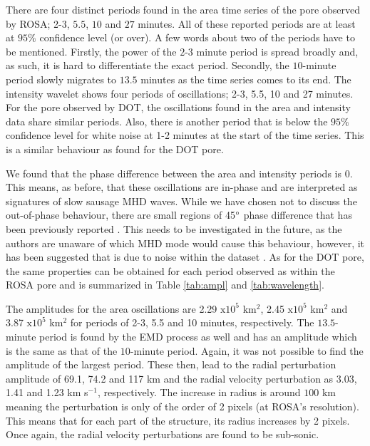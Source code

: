     There are four distinct periods found in the area time series of the pore observed by ROSA; 2-3, $5.5$, $10$ and $27$ minutes.
    All of these reported periods are at least at $95\%$ confidence level (or over).
    A few words about two of the periods have to be mentioned.
    Firstly, the power of the $2$-$3$ minute period is spread broadly and, as such, it is hard to differentiate the exact period.
    Secondly, the $10$-minute period slowly migrates to $13.5$ minutes as the time series comes to its end.
    The intensity wavelet shows four periods of oscillations; 2-3, 5.5, 10 and 27 minutes.
    For the pore observed by DOT, the oscillations found in the area and intensity data share similar periods.
    Also, there is another period that is below the $95\%$ confidence level for white noise at 1-2 minutes at the start of the time series.
    This is a similar behaviour as found for the DOT pore.
    
    We found that the phase difference between the area and intensity periods is 0\degree.
    This means, as before, that these oscillations are in-phase and are interpreted as signatures of slow sausage MHD waves.
    While we have chosen not to discuss the out-of-phase behaviour, there are small regions of 45$\degree$ phase difference that has been previously reported \citep{Dorotovic2014}.
    This needs to be investigated in the future, as the authors are unaware of which MHD mode would cause this behaviour, however, it has been suggested that is due to noise within the dataset \citep{2015A&A...579A..73M}.
    As for the DOT pore, the same properties can be obtained for each period observed as within the ROSA pore and is summarized in Table \ref{tab:ampl} and \ref{tab:wavelength}.
    
	The amplitudes for the area oscillations are 2.29 $\mathrm{x}10^5$ km$^2$, 2.45 $\mathrm{x}10^5$ km$^2$ and 3.87 $\mathrm{x}10^5$ km$^2$ for periods of 2-3, 5.5 and 10 minutes, respectively.
	The $13.5$-minute period is found by the EMD process as well and has an amplitude which is the same as that of the $10$-minute period. 
	Again, it was not possible to find the amplitude of the largest period.
	These then, lead to the radial perturbation amplitude of 69.1, 74.2 and 117 km and the radial velocity perturbation as 3.03, 1.41 and 1.23 km s$^{-1}$, respectively.
	The increase in radius is around $100$ km meaning the perturbation is only of the order of 2 pixels (at ROSA's resolution).
	This means that for each part of the structure, its radius increases by 2 pixels.
	Once again, the radial velocity perturbations are found to be sub-sonic.
	
